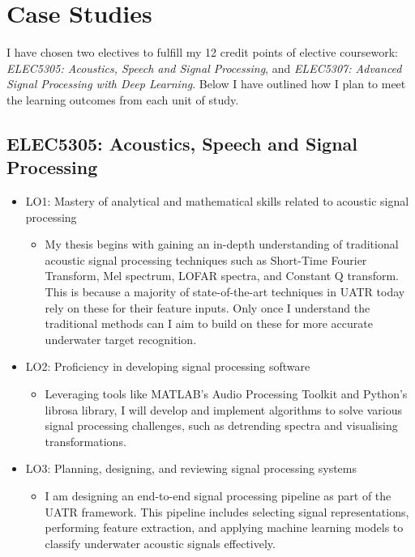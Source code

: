 \chapter{Case Studies}

I have chosen two electives to fulfill my 12 credit points of elective coursework: \textit{ELEC5305: Acoustics, Speech and Signal Processing}, and \textit{ELEC5307: Advanced Signal Processing with Deep Learning}. Below I have outlined how I plan to meet the learning outcomes from each unit of study.

\section{ELEC5305: Acoustics, Speech and Signal Processing}

\begin{itemize}
    \item LO1: Mastery of analytical and mathematical skills related to acoustic signal processing
    \begin{itemize}
        \item My thesis begins with gaining an in-depth understanding of traditional acoustic signal processing techniques such as Short-Time Fourier Transform, Mel spectrum, LOFAR spectra, and Constant Q transform. This is because a majority of state-of-the-art techniques in UATR today rely on these for their feature inputs. Only once I understand the traditional methods can I aim to build on these for more accurate underwater target recognition.
    \end{itemize}
    \item LO2: Proficiency in developing signal processing software
    \begin{itemize}
        \item Leveraging tools like MATLAB's Audio Processing Toolkit and Python's librosa library, I will develop and implement algorithms to solve various signal processing challenges, such as detrending spectra and visualising transformations.
    \end{itemize}
    \item LO3: Planning, designing, and reviewing signal processing systems
    \begin{itemize}
        \item I am designing an end-to-end signal processing pipeline as part of the UATR framework. This pipeline includes selecting signal representations, performing feature extraction, and applying machine learning models to classify underwater acoustic signals effectively.

\end{itemize}
\end{itemize}
